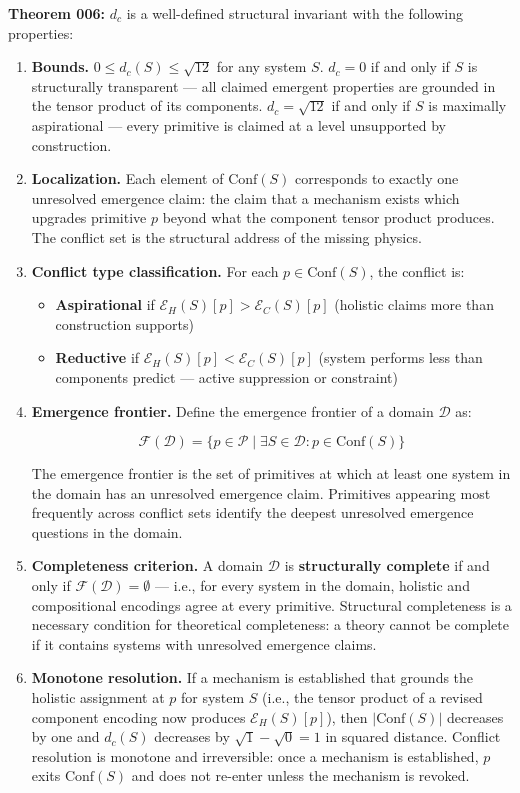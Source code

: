 \documentclass[12pt,a4paper]{article}
\begin{document}
\textbf{Theorem 006:} $d_c$ is a well-defined structural invariant with the following properties:

\begin{enumerate}
    \item \textbf{Bounds.} $0 \leq d_c(S) \leq \sqrt{12}$ for any system $S$. $d_c = 0$ if and only if $S$ is structurally transparent --- all claimed emergent properties are grounded in the tensor product of its components. $d_c = \sqrt{12}$ if and only if $S$ is maximally aspirational --- every primitive is claimed at a level unsupported by construction.
    \item \textbf{Localization.} Each element of $\text{Conf}(S)$ corresponds to exactly one unresolved emergence claim: the claim that a mechanism exists which upgrades primitive $p$ beyond what the component tensor product produces. The conflict set is the structural address of the missing physics.
    \item 
    \textbf{Conflict type classification.} For each $p \in \text{Conf}(S)$, the conflict is:

    \begin{itemize}
    \item \textbf{Aspirational} if $\mathcal{E}_H(S)[p] > \mathcal{E}_C(S)[p]$ (holistic claims more than construction supports)
    \item \textbf{Reductive} if $\mathcal{E}_H(S)[p] < \mathcal{E}_C(S)[p]$ (system performs less than components predict --- active suppression or constraint)
\end{itemize}

    \item 
    \textbf{Emergence frontier.} Define the emergence frontier of a domain $\mathcal{D}$ as:

    \[\mathcal{F}(\mathcal{D}) = \{ p \in \mathcal{P} \mid \exists S \in \mathcal{D} : p \in \text{Conf}(S) \}\]

    The emergence frontier is the set of primitives at which at least one system in the domain has an unresolved emergence claim. Primitives appearing most frequently across conflict sets identify the deepest unresolved emergence questions in the domain.

    \item \textbf{Completeness criterion.} A domain $\mathcal{D}$ is \textbf{structurally complete} if and only if $\mathcal{F}(\mathcal{D}) = \emptyset$ --- i.e., for every system in the domain, holistic and compositional encodings agree at every primitive. Structural completeness is a necessary condition for theoretical completeness: a theory cannot be complete if it contains systems with unresolved emergence claims.
    \item \textbf{Monotone resolution.} If a mechanism is established that grounds the holistic assignment at $p$ for system $S$ (i.e., the tensor product of a revised component encoding now produces $\mathcal{E}_H(S)[p]$), then $|\text{Conf}(S)|$ decreases by one and $d_c(S)$ decreases by $\sqrt{1} - \sqrt{0} = 1$ in squared distance. Conflict resolution is monotone and irreversible: once a mechanism is established, $p$ exits $\text{Conf}(S)$ and does not re-enter unless the mechanism is revoked.
\end{enumerate}
\end{document}

